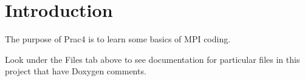 \hypertarget{index_intro_sec}{}\section{Introduction}\label{index_intro_sec}
The purpose of Prac4 is to learn some basics of M\+PI coding.

Look under the Files tab above to see documentation for particular files in this project that have Doxygen comments. 